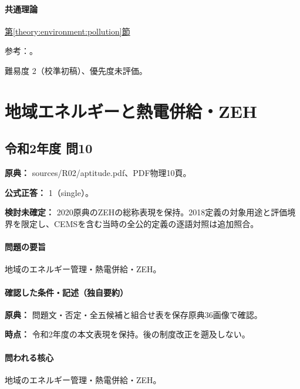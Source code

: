 \paragraph{共通理論} \hyperref[theory:environment:pollution]{第\ref*{theory:environment:pollution}節}

\par 参考：\cite{env_pollution}。

\par 難易度 2（校準初稿）、優先度未評価。

\section{地域エネルギーと熱電併給・ZEH}

\subsection{令和2年度 問10}
\label{q:r02-reg-apt-10}

\noindent\textbf{原典：} sources/R02/aptitude.pdf、PDF物理10頁。

\textbf{公式正答：} 1（single）。

\par\textbf{検討未確定：} 2020原典のZEHの総称表現を保持。2018定義の対象用途と評価境界を限定し、CEMSを含む当時の全公的定義の逐語対照は追加照合。

\paragraph{問題の要旨} 地域のエネルギー管理・熱電併給・ZEH。

\paragraph{確認した条件・記述（独自要約）}\mbox{}\par

\noindent\textbf{原典：} 問題文・否定・全五候補と組合せ表を保存原典36画像で確認。\par

\noindent\textbf{時点：} 令和2年度の本文表現を保持。後の制度改正を遡及しない。\par

\paragraph{問われる核心} 地域のエネルギー管理・熱電併給・ZEH。

